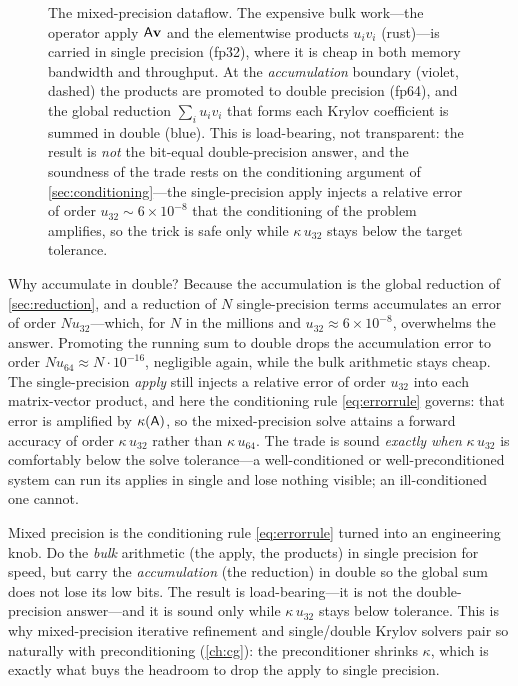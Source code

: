 \begin{figure}[t]
\caption[Single-precision apply, double-precision accumulate]{The mixed-precision
dataflow. The expensive bulk work---the operator apply $\mathsf{A}\mathbf{v}$ and the
elementwise products $u_i v_i$ (rust)---is carried in single precision (fp32),
where it is cheap in both memory bandwidth and throughput. At the
\emph{accumulation} boundary (violet, dashed) the products are promoted to double
precision (fp64), and the global reduction $\sum_i u_i v_i$ that forms each Krylov
coefficient is summed in double (blue). This is load-bearing, not transparent: the
result is \emph{not} the bit-equal double-precision answer, and the soundness of the
trade rests on the conditioning argument of \cref{sec:conditioning}---the
single-precision apply injects a relative error of order $u_{32}\sim 6\times10^{-8}$
that the conditioning of the problem amplifies, so the trick is safe only while
$\kappa\,u_{32}$ stays below the target tolerance.}
\label{fig:mixed}
\end{figure}

Why accumulate in double? Because the accumulation is the global reduction of
\cref{sec:reduction}, and a reduction of $N$ single-precision terms accumulates an
error of order $N u_{32}$---which, for $N$ in the millions and $u_{32}\approx
6\times10^{-8}$, overwhelms the answer. Promoting the running sum to double drops
the accumulation error to order $N u_{64} \approx N\cdot10^{-16}$, negligible again,
while the bulk arithmetic stays cheap. The single-precision \emph{apply} still
injects a relative error of order $u_{32}$ into each matrix-vector product, and here
the conditioning rule \eqref{eq:errorrule} governs: that error is amplified by
$\kappa(\mathsf{A})$, so the mixed-precision solve attains a forward accuracy of order
$\kappa\,u_{32}$ rather than $\kappa\,u_{64}$. The trade is sound \emph{exactly
when} $\kappa\,u_{32}$ is comfortably below the solve tolerance---a well-conditioned
or well-preconditioned system can run its applies in single and lose nothing
visible; an ill-conditioned one cannot.

\begin{keyidea}
Mixed precision is the conditioning rule \eqref{eq:errorrule} turned into an
engineering knob. Do the \emph{bulk} arithmetic (the apply, the products) in single
precision for speed, but carry the \emph{accumulation} (the reduction) in double so
the global sum does not lose its low bits. The result is load-bearing---it is not
the double-precision answer---and it is sound only while $\kappa\,u_{32}$ stays below
tolerance. This is why mixed-precision iterative refinement and single/double Krylov
solvers pair so naturally with preconditioning (\cref{ch:cg}): the preconditioner
shrinks $\kappa$, which is exactly what buys the headroom to drop the apply to
single precision.
\end{keyidea}

